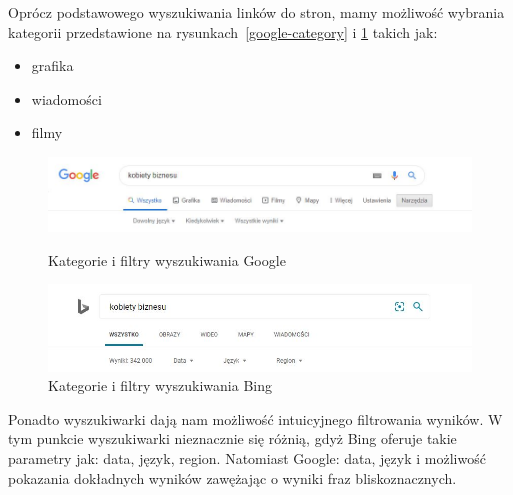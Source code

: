 \documentclass[licencjacka]{pracadypl}
\theoremstyle{definition}
\begin{document}
Oprócz podstawowego wyszukiwania linków do stron, mamy możliwość wybrania kategorii przedstawione na rysunkach~\ref{google-category} i \ref{bing-category} takich jak:
\begin{itemize}
	\item grafika
	\item wiadomości
	\item filmy
\end{itemize}

\begin{figure}[!htb]
	\includegraphics[width=\linewidth]{img/google-category}
	\caption{Kategorie i filtry wyszukiwania Google} \label{google-category}
	\endminipage\hfill 
	\includegraphics[width=\linewidth]{img/bing-category}
	\caption{Kategorie i filtry wyszukiwania Bing} \label{bing-category}
	\endminipage
\end{figure}

Ponadto wyszukiwarki dają nam możliwość intuicyjnego filtrowania wyników. W tym punkcie wyszukiwarki nieznacznie się różnią, gdyż Bing oferuje takie parametry jak: data, język, region. Natomiast Google: data, język i możliwość pokazania dokładnych wyników zawężając o wyniki fraz bliskoznacznych. 
\end{document}

